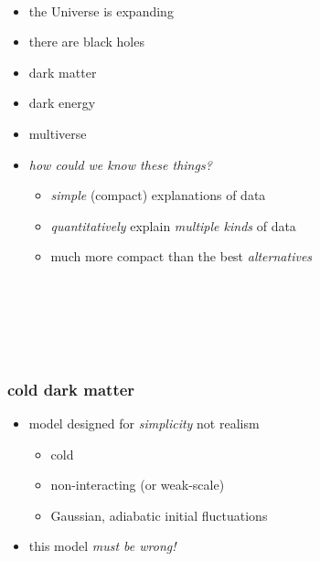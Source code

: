 \documentclass{beamer}
\begin{document}
\whiteonblack

{\begin{frame}[plain]~\end{frame}}

\begin{frame}
\begin{itemize}
\item the Universe is expanding
\item there are black holes
\item dark matter
\item dark energy
\item multiverse
\item \emph{how could we know these things?}
  \begin{itemize}
  \item \emph{simple} (compact) explanations of data
  \item \emph{quantitatively} explain \emph{multiple kinds} of data
  \item much more compact than the best \emph{alternatives}
  \end{itemize}
\end{itemize}
\end{frame}

{\begin{frame}[plain]~\end{frame}}

{\begin{frame}[plain]~\end{frame}}

{\begin{frame}[plain]~\end{frame}}

\begin{frame}
\frametitle{cold dark matter}
\begin{itemize}
\item model designed for \emph{simplicity} not realism
  \begin{itemize}
  \item cold
  \item non-interacting (or weak-scale)
  \item Gaussian, adiabatic initial fluctuations
  \end{itemize}
\item this model \emph{must be wrong!}
\end{itemize}
\end{frame}
\end{document}
